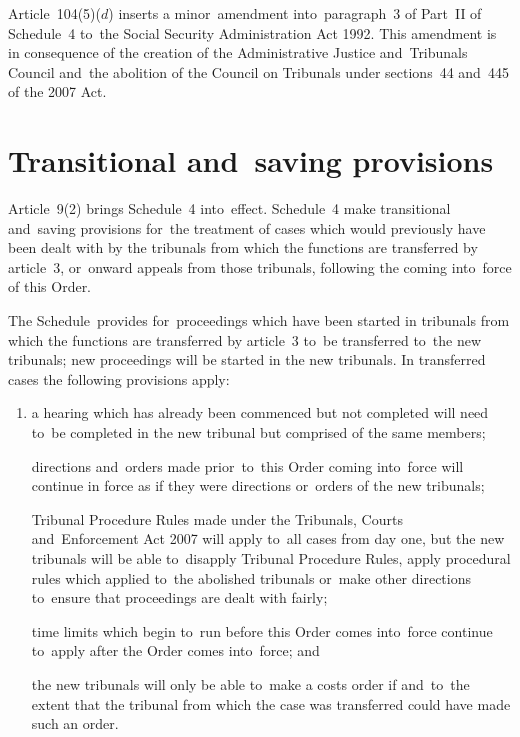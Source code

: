 \documentclass[12pt,a4paper]{article}
\begin{document}
Article~104(5)($d$)  inserts a minor~amendment into~paragraph~3 of Part~II of Schedule~4 to~the Social Security Administration Act 1992. This amendment is in consequence of the creation of the Administrative Justice and~Tribunals Council and~the abolition of the Council on Tribunals under sections~44 and~445 of the 2007 Act.

\section*{Transitional and~saving provisions}

Article~9(2) brings Schedule~4 into~effect. Schedule~4 make transitional and~saving provisions for~the treatment of cases which would previously have been dealt with by the tribunals from which the functions are transferred by article~3, or~onward appeals from those tribunals, following the coming into~force of this Order.

The Schedule~provides for~proceedings which have been started in tribunals from which the functions are transferred by article~3 to~be transferred to~the new tribunals; new proceedings will be started in the new tribunals. In transferred cases the following provisions apply:
\begin{enumerate}\item[]
    a hearing which has already been commenced but not completed will need to~be completed in the new tribunal but comprised of the same members;

    directions and~orders made prior~to~this Order coming into~force will continue in force as if they were directions or~orders of the new tribunals;

    Tribunal Procedure Rules made under the Tribunals, Courts and~Enforcement Act 2007 will apply to~all cases from day one, but the new tribunals will be able to~disapply Tribunal Procedure Rules, apply procedural rules which applied to~the abolished tribunals or~make other directions to~ensure that proceedings are dealt with fairly;

    time limits which begin to~run before this Order comes into~force continue to~apply after the Order comes into~force; and

    the new tribunals will only be able to~make a costs order if and~to~the extent that the tribunal from which the case was transferred could have made such an order. 
\end{enumerate}
\end{document}
